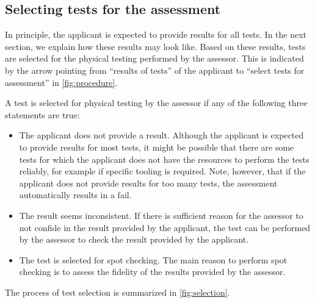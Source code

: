 \documentclass[twoside,twocolumn,9pt]{article}
\theoremstyle{plain}
\theoremstyle{remark}\newtheorem{remarkenv}{Remark}        %
\begin{document}
\subsection{Selecting tests for the assessment}
\label{sec:selection}

In principle, the applicant is expected to provide results for all tests. In the next section, we explain how these results may look like. Based on these results, tests are selected for the physical testing performed by the assessor. This is indicated by the arrow pointing from ``results of tests'' of the applicant to ``select tests for assessment'' in \cref{fig:procedure}.  

A test is selected for physical testing by the assessor if any of the following three statements are true:
\begin{itemize}
	\item The applicant does not provide a result. Although the applicant is expected to provide results for most tests, it might be possible that there are some tests for which the applicant does not have the resources to perform the tests reliably, for example if specific tooling is required. Note, however, that if the applicant does not provide results for too many tests, the assessment automatically results in a fail.
	\item The result seems inconsistent. If there is sufficient reason for the assessor to not confide in the result provided by the applicant, the test can be performed by the assessor to check the result provided by the applicant.
	\item The test is selected for spot checking. The main reason to perform spot checking is to assess the fidelity of the results provided by the assessor.
\end{itemize}
The process of test selection is summarized in \cref{fig:selection}.
\end{document}
